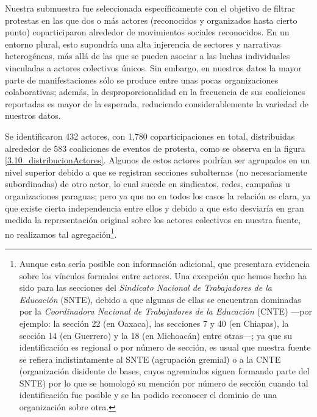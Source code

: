 \documentclass[letterpaper, 11pt]{book}
\theoremstyle{definition}
\theoremstyle{remark}
\begin{document}
Nuestra submuestra fue seleccionada específicamente con el objetivo de filtrar protestas en las que dos o más actores (reconocidos y organizados hasta cierto punto) coparticiparon alrededor de movimientos sociales reconocidos. 
En un entorno plural, esto supondría una alta injerencia de sectores y narrativas heterogéneas, más allá de las que se pueden asociar a las luchas individuales vinculadas a actores colectivos únicos. 
Sin embargo, en nuestros datos la mayor parte de manifestaciones sólo se produce entre unas pocas organizaciones colaborativas; además, la desproporcionalidad en la frecuencia de sus coaliciones reportadas es mayor de la esperada, reduciendo considerablemente la variedad de nuestros datos.


Se identificaron 432 actores, con 1,780 coparticipaciones en total, distribuidas alrededor de 583 coaliciones de eventos de protesta, como se observa en la figura \ref{3.10_distribucionActores}. 
Algunos de estos actores podrían ser agrupados en un nivel superior debido a que se registran secciones subalternas (no necesariamente subordinadas) de otro actor, lo cual sucede en sindicatos, redes, campañas u organizaciones paraguas; pero ya que no en todos los casos la relación es clara, ya que existe cierta independencia entre ellos y debido a que esto desviaría en gran medida la representación original sobre los actores colectivos en nuestra fuente, no realizamos tal agregación\footnote{
    Aunque esta sería posible con información adicional, que presentara evidencia sobre los vínculos formales entre actores. 
    Una excepción que hemos hecho ha sido para las secciones del \emph{Sindicato Nacional de Trabajadores de la Educación} (SNTE), debido a que algunas de ellas se encuentran dominadas por la \emph{Coordinadora Nacional de Trabajadores de la Educación} (CNTE) ---por ejemplo: la sección 22 (en Oaxaca), las secciones 7 y 40 (en Chiapas), la sección 14 (en Guerrero) y la 18 (en Michoacán) entre otras---; ya que su identificación es regional o por número de sección, es usual que nuestra fuente se refiera indistintamente al SNTE (agrupación gremial) o a la CNTE (organización disidente de bases, cuyos agremiados siguen formando parte del SNTE) por lo que se homologó su mención por número de sección cuando tal identificación fue posible y se ha podido reconocer el dominio de una organización sobre otra.
}. 
\end{document}
